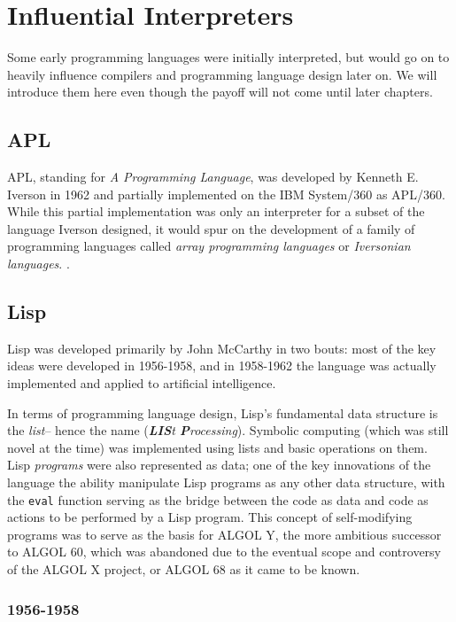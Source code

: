 \section{Influential Interpreters}

Some early programming languages were initially interpreted,
but would go on to heavily influence compilers and programming language design
later on. We will introduce them here even though the payoff will not come until
later chapters.

\subsection{APL}

APL, standing for \textit{A Programming Language}, was developed by Kenneth E. Iverson in 1962
and partially implemented on the IBM System/360 as APL/360.
While this partial implementation was only an interpreter for a subset of the language Iverson
designed, it would spur on the development of a family of programming languages
called \textit{array programming languages} or \textit{Iversonian languages}.
.

\subsection{Lisp}

Lisp was developed primarily by John McCarthy in two bouts:
most of the key ideas were developed in 1956-1958,
and in 1958-1962 the language was actually implemented and applied to artificial
intelligence.

In terms of programming language design, Lisp's fundamental data structure is the \textit{list}--
hence the name (\textit{\textbf{LIS}t \textbf{P}rocessing}).
Symbolic computing (which was still novel at the time) was implemented using lists and basic
operations on them.
Lisp \textit{programs} were also represented as data; one of the key innovations of the language
the ability manipulate Lisp programs as any other data structure, with the \texttt{eval}
function serving as the bridge between the code as data and code as actions to be performed
by a Lisp program.
This concept of self-modifying programs was to serve as the basis for ALGOL Y,
the more ambitious successor to ALGOL 60,
which was abandoned due to the eventual scope and controversy of the ALGOL X project,
or ALGOL 68 as it came to be known.

\subsubsection{1956-1958}

